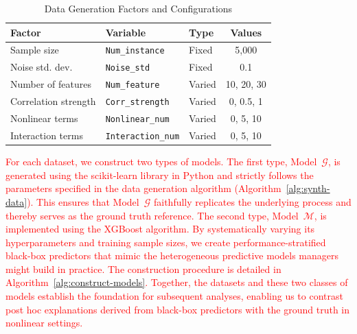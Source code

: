 \documentclass[mnsc,blindrev]{informs3}
\begin{document}
\begin{table}[htbp]
\centering
\caption{Data Generation Factors and Configurations}
\label{tab:data_factors}
\begin{tabular}{lllc}
\toprule
\textbf{Factor} & \textbf{Variable} & \textbf{Type} & \textbf{Values} \\
\midrule
Sample size & \texttt{Num\_instance} & Fixed & 5{,}000 \\
Noise std. dev. & \texttt{Noise\_std} & Fixed & 0.1 \\
Number of features & \texttt{Num\_feature} & Varied & 10, 20, 30 \\
Correlation strength & \texttt{Corr\_strength} & Varied & 0, 0.5, 1 \\
Nonlinear terms & \texttt{Nonlinear\_num} & Varied & 0, 5, 10 \\
Interaction terms & \texttt{Interaction\_num} & Varied & 0, 5, 10 \\
\bottomrule
\end{tabular}
\end{table}

\textcolor{red}{For each dataset, we construct two types of models. The first type, Model~$\mathcal{G}$, is generated using the scikit-learn library in Python and strictly follows the parameters specified in the data generation algorithm (Algorithm~\ref{alg:synth-data}). This ensures that Model~$\mathcal{G}$ faithfully replicates the underlying process and thereby serves as the ground truth reference. The second type, Model~$\mathcal{M}$, is implemented using the XGBoost algorithm. By systematically varying its hyperparameters and training sample sizes, we create performance-stratified black-box predictors that mimic the heterogeneous predictive models managers might build in practice. The construction procedure is detailed in Algorithm~\ref{alg:construct-models}. Together, the datasets and these two classes of models establish the foundation for subsequent analyses, enabling us to contrast post hoc explanations derived from black-box predictors with the ground truth in nonlinear settings.}

\end{document}
